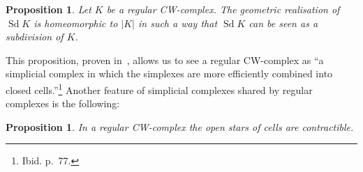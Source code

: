 \documentclass[10pt]{amsart}
\newtheorem{prop}[theo]{Proposition}
\theoremstyle{definition}
\numberwithin{equation}{section}
\numberwithin{figure}{section}
\DeclareMathOperator{\Sd}{Sd}
\begin{document}
\begin{prop}\label{prop:bar_sub_cw}
Let $K$ be a regular CW-complex. The geometric realisation of $\Sd K$ is homeomorphic to $|K|$ in such a way that $\Sd K$ can be seen as a subdivision of $K$.
\end{prop}

This proposition, proven in~\cite[Theorem~1.7, pp.~80-81.]{Lun-Wei_top_cw},
allows us to see a regular CW-complex as ``a simplicial complex in which the simplexes are more efficiently combined into closed cells.''\footnote{Ibid. p.~77.} Another feature of simplicial complexes shared by regular complexes is the following:

\begin{prop}
In a regular CW-complex the open stars of cells are contractible.
\end{prop}
\end{document}

